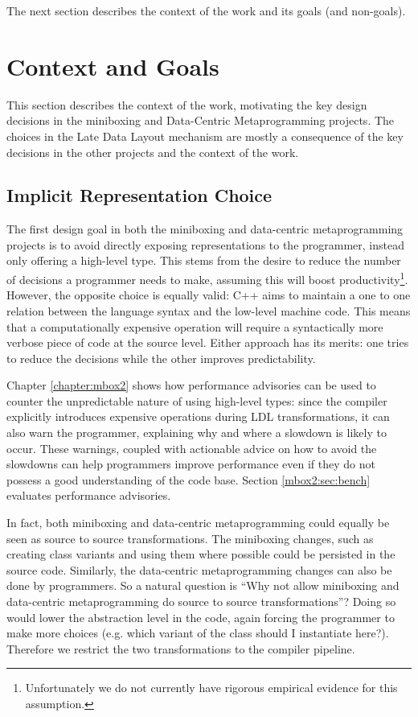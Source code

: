 The next section describes the context of the work and its goals (and non-goals).

\section{Context and Goals}

This section describes the context of the work, motivating the key design decisions in the miniboxing and Data-Centric Metaprogramming projects. The choices in the Late Data Layout mechanism are mostly a consequence of the key decisions in the other projects and the context of the work.

\subsection{Implicit Representation Choice}

The first design goal in both the miniboxing and data-centric metaprogramming projects is to avoid directly exposing representations to the programmer, instead only offering a high-level type. This stems from the desire to reduce the number of decisions a programmer needs to make, assuming this will boost productivity\footnote{Unfortunately we do not currently have rigorous empirical evidence for this assumption.}. However, the opposite choice is equally valid: C++ aims to maintain a one to one relation between the language syntax and the low-level machine code. This means that a computationally expensive operation will require a syntactically more verbose piece of code at the source level. Either approach has its merits: one tries to reduce the decisions while the other improves predictability.

Chapter \ref{chapter:mbox2} shows how performance advisories can be used to counter the unpredictable nature of using high-level types: since the compiler explicitly introduces expensive operations during LDL transformations, it can also warn the programmer, explaining why and where a slowdown is likely to occur. These warnings, coupled with actionable advice on how to avoid the slowdowns can help programmers improve performance even if they do not possess a good understanding of the code base. Section \ref{mbox2:sec:bench} evaluates performance advisories.

In fact, both miniboxing and data-centric metaprogramming could equally be seen as source to source transformations. The miniboxing changes, such as creating class variants and using them where possible could be persisted in the source code. Similarly, the data-centric metaprogramming changes can also be done by programmers. So a natural question is ``Why not allow miniboxing and data-centric metaprogramming do source to source transformations''? Doing so would lower the abstraction level in the code, again forcing the programmer to make more choices (e.g. which variant of the class should I instantiate here?). Therefore we restrict the two transformations to the compiler pipeline.

